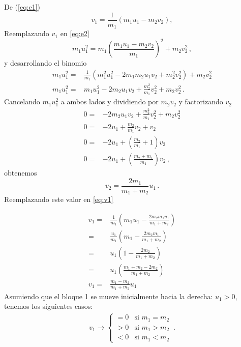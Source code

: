 \begin{itemize}
De (\ref{eq:e1})
\begin{equation}
  \label{eq:v1}
  v_1 = \frac{1}{m_1}( m_1u_1 - m_2 v_2),
\end{equation}
Reemplazando $v_1$ en \ref{eq:e2}
\begin{equation}
   m_1 u_1^2 = m_1 \left( \frac{m_1u_1 - m_2 v_2}{m_1} \right)^2 +  m_2 v^2_2\,,
\end{equation}
y desarrollando el binomio
\begin{align}
 m_1 u_1^2 =& \frac{1}{m_1}( m_1^2 u_1^2 - 2 m_1 m_2 u_1 v_2 + m_2^2 v_2^2) + m_2 v_2^2\nonumber\\
m_1 u_1^2 =&  m_1 u_1^2 - 2 m_2 u_1 v_2 + \frac{m_2^2}{m_1} v_2^2 + m_2 v_2^2\,.
\end{align}
Cancelando $m_1 u_1^2$ a ambos lados y dividiendo por $m_2v_2$ y factorizando $v_2$
\begin{align}
  0=& - 2 m_2 u_1 v_2 + \frac{m_2^2}{m_1} v_2^2 + m_2 v_2^2\nonumber\\
  0=& - 2  u_1  + \frac{m_2}{m_1} v_2 + v_2\nonumber\\
  0=& - 2  u_1  + \left(\frac{m_2}{m_1} +1 \right)v_2\nonumber\\
  0=& - 2  u_1  + \left(\frac{m_2+m_1}{m_1}\right)v_2\,,
\end{align}
obtenemos
\begin{equation}
  v_2 = \frac{2m_1}{m_1+ m_2}u_1\,.
\end{equation}
Reemplazando este valor en \ref{eq:v1}

\begin{align}
  v_1 =& \frac{1}{m_1}\left(m_1u_1 - \frac{2m_2 m_1u_1}{m_1+m_2} \right)\nonumber\\
  =& \frac{u_1}{m_1}\left(m_1 - \frac{2m_2 m_1}{m_1+m_2} \right)\nonumber\\
  =& u_1\left(1 - \frac{2m_2}{m_1+m_2} \right)\nonumber\\
  =& u_1\left(\frac{m_1+m_2 - 2m_2}{m_1+m_2} \right)\nonumber\\
  v_1 = &\frac{m_1 - m_2}{m_1 + m_2} u_1
\end{align}
Asumiendo que el bloque 1 se mueve inicialmente hacia la derecha: $u_1>0$,  tenemos los siguientes casos:
\begin{align}
  v_1\to
  \begin{cases}
    =0 & \text{si\ }m_1=m_2\\
    >0 & \text{si\ }m_1>m_2\\
    <0 & \text{si\ }m_1<m_2
  \end{cases}\,.
\end{align}




\end{itemize}
